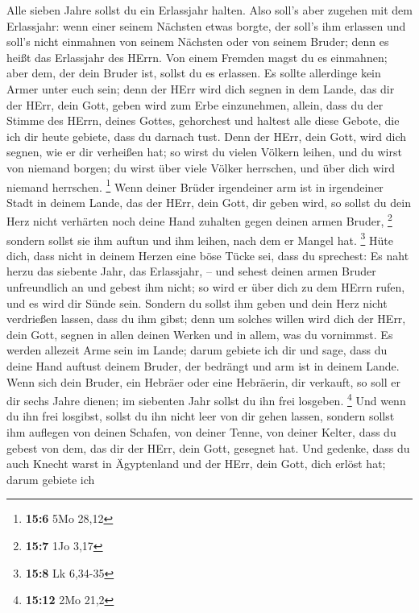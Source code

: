  Alle sieben Jahre sollst du ein Erlassjahr halten.
 Also soll's aber zugehen mit dem Erlassjahr: wenn einer
seinem Nächsten etwas borgte, der soll's ihm erlassen und soll's nicht
einmahnen von seinem Nächsten oder von seinem Bruder; denn es heißt das
Erlassjahr des HErrn.  Von einem Fremden magst du es
einmahnen; aber dem, der dein Bruder ist, sollst du es erlassen.
 Es sollte allerdinge kein Armer unter euch sein; denn der
HErr wird dich segnen in dem Lande, das dir der HErr, dein Gott, geben
wird zum Erbe einzunehmen,  allein, dass du der Stimme des
HErrn, deines Gottes, gehorchest und haltest alle diese Gebote, die ich
dir heute gebiete, dass du darnach tust.  Denn der HErr,
dein Gott, wird dich segnen, wie er dir verheißen hat; so wirst du
vielen Völkern leihen, und du wirst von niemand borgen; du wirst über
viele Völker herrschen, und über dich wird niemand herrschen.
\footnote{\textbf{15:6} 5Mo 28,12}  Wenn deiner Brüder
irgendeiner arm ist in irgendeiner Stadt in deinem Lande, das der HErr,
dein Gott, dir geben wird, so sollst du dein Herz nicht verhärten noch
deine Hand zuhalten gegen deinen armen Bruder, \footnote{\textbf{15:7}
  1Jo 3,17}  sondern sollst sie ihm auftun und ihm leihen,
nach dem er Mangel hat. \footnote{\textbf{15:8} Lk 6,34-35}
 Hüte dich, dass nicht in deinem Herzen eine böse Tücke
sei, dass du sprechest: Es naht herzu das siebente Jahr, das Erlassjahr,
-- und sehest deinen armen Bruder unfreundlich an und gebest ihm nicht;
so wird er über dich zu dem HErrn rufen, und es wird dir Sünde sein.
 Sondern du sollst ihm geben und dein Herz nicht
verdrießen lassen, dass du ihm gibst; denn um solches willen wird dich
der HErr, dein Gott, segnen in allen deinen Werken und in allem, was du
vornimmst.  Es werden allezeit Arme sein im Lande; darum
gebiete ich dir und sage, dass du deine Hand auftust deinem Bruder, der
bedrängt und arm ist in deinem Lande.  Wenn sich dein
Bruder, ein Hebräer oder eine Hebräerin, dir verkauft, so soll er dir
sechs Jahre dienen; im siebenten Jahr sollst du ihn frei losgeben.
\footnote{\textbf{15:12} 2Mo 21,2}  Und wenn du ihn frei
losgibst, sollst du ihn nicht leer von dir gehen lassen, 
sondern sollst ihm auflegen von deinen Schafen, von deiner Tenne, von
deiner Kelter, dass du gebest von dem, das dir der HErr, dein Gott,
gesegnet hat.  Und gedenke, dass du auch Knecht warst in
Ägyptenland und der HErr, dein Gott, dich erlöst hat; darum gebiete ich
